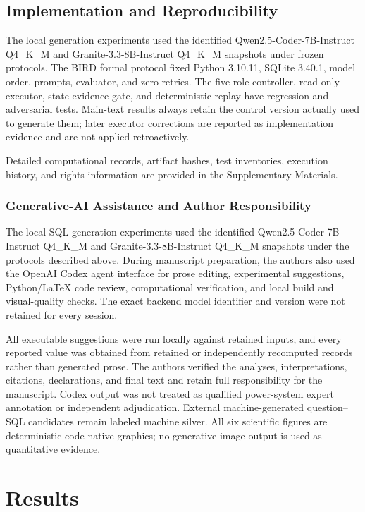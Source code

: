 \documentclass[applsci,article,submit,moreauthors]{Definitions/mdpi}
\begin{document}
\subsection{Implementation and Reproducibility}

The local generation experiments used the identified Qwen2.5-Coder-7B-Instruct Q4\_K\_M and Granite-3.3-8B-Instruct Q4\_K\_M snapshots under frozen protocols. The BIRD formal protocol fixed Python 3.10.11, SQLite 3.40.1, model order, prompts, evaluator, and zero retries. The five-role controller, read-only executor, state-evidence gate, and deterministic replay have regression and adversarial tests. Main-text results always retain the control version actually used to generate them; later executor corrections are reported as implementation evidence and are not applied retroactively.

Detailed computational records, artifact hashes, test inventories, execution history, and rights information are provided in the Supplementary Materials.

\subsubsection{Generative-AI Assistance and Author Responsibility}

The local SQL-generation experiments used the identified Qwen2.5-Coder-7B-Instruct Q4\_K\_M and Granite-3.3-8B-Instruct Q4\_K\_M snapshots under the protocols described above. During manuscript preparation, the authors also used the OpenAI Codex agent interface for prose editing, experimental suggestions, Python/\LaTeX{} code review, computational verification, and local build and visual-quality checks. The exact backend model identifier and version were not retained for every session.

All executable suggestions were run locally against retained inputs, and every reported value was obtained from retained or independently recomputed records rather than generated prose. The authors verified the analyses, interpretations, citations, declarations, and final text and retain full responsibility for the manuscript. Codex output was not treated as qualified power-system expert annotation or independent adjudication. External machine-generated question--SQL candidates remain labeled machine silver. All six scientific figures are deterministic code-native graphics; no generative-image output is used as quantitative evidence.

\section{Results}
\end{document}

